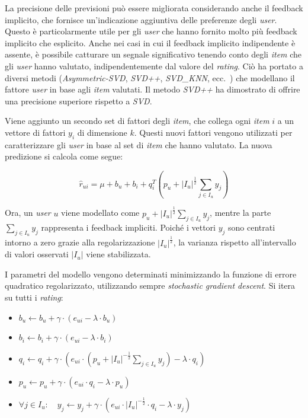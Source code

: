 La precisione delle previsioni può essere migliorata considerando anche il feedback implicito, che fornisce un'indicazione aggiuntiva delle preferenze degli \textit{user}. Questo è particolarmente utile per gli \textit{user} che hanno fornito molto più feedback implicito che esplicito. Anche nei casi in cui il feedback implicito indipendente è assente, è possibile catturare un segnale significativo tenendo conto degli \textit{item} che gli \textit{user} hanno valutato, indipendentemente dal valore del \textit{rating}. Ciò ha portato a diversi metodi (\textit{Asymmetric-SVD}, \textit{SVD++}, \textit{SVD\_KNN}, ecc.~\cite{SVD++, SVD_KNN}) che modellano il fattore \textit{user} in base agli \textit{item} valutati. Il metodo \textit{SVD++} ha dimostrato di offrire una precisione superiore rispetto a \textit{SVD}.

Viene aggiunto un secondo set di fattori degli \textit{item}, che collega ogni \textit{item} $i$ a un vettore di fattori $y_i$ di dimensione $k$. Questi nuovi fattori vengono utilizzati per caratterizzare gli \textit{user} in base al set di \textit{item} che hanno valutato. La nuova predizione si calcola come segue:

\[
\hat{r}_{ui} = \mu + b_u + b_i + q_i^T \left(p_u + |I_u|^{\frac{1}{2}} \sum_{j \in I_u} y_j \right)
\]

Ora, un \textit{user} $u$ viene modellato come $p_u + |I_u|^{\frac{1}{2}} \sum_{j \in I_u} y_j$, mentre la parte $\sum_{j \in I_u} y_j$ rappresenta i feedback impliciti. Poiché i vettori $y_j$ sono centrati intorno a zero grazie alla regolarizzazione $|I_u|^{\frac{1}{2}}$, la varianza rispetto all'intervallo di valori osservati $|I_u|$ viene stabilizzata.

I parametri del modello vengono determinati minimizzando la funzione di errore quadratico regolarizzato, utilizzando sempre \textit{stochastic gradient descent}. Si itera su tutti i \textit{rating}:

\begin{itemize}
  \item $b_u \leftarrow b_u + \gamma \cdot (e_{ui} - \lambda \cdot b_u)$
  \item $b_i \leftarrow b_i + \gamma \cdot (e_{ui} - \lambda \cdot b_i)$
  \item $q_i \leftarrow q_i + \gamma \cdot \left( e_{ui} \cdot \left( p_u + |I_u|^{-\frac{1}{2}} \sum_{j \in I_u} y_j \right) - \lambda \cdot q_i \right)$
  \item $p_u \leftarrow p_u + \gamma \cdot (e_{ui} \cdot q_i - \lambda \cdot p_u)$
  \item $\forall j \in I_u: \quad y_j \leftarrow y_j + \gamma \cdot \left( e_{ui} \cdot |I_u|^{-\frac{1}{2}} \cdot q_i - \lambda \cdot y_j \right)$
\end{itemize}



